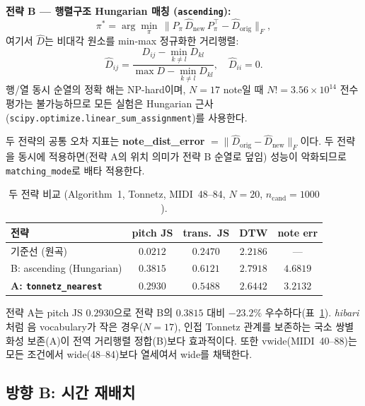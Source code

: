 \documentclass[conference,10pt,a4paper]{IEEEtran}
\begin{document}
\textbf{전략 B --- 행렬구조 Hungarian 매칭 (\texttt{ascending}):}
\begin{equation}
\pi^{*} = \arg\min_{\pi}\,
  \bigl\|P_{\pi}\,\hat{D}_{\mathrm{new}}\,P_{\pi}^{\top}
         - \hat{D}_{\mathrm{orig}}\bigr\|_{F},
\end{equation}
여기서 $\hat{D}$는 비대각 원소를 min-max 정규화한 거리행렬:
\begin{equation}
\hat{D}_{ij}
  = \frac{D_{ij}-\min_{k\neq l}D_{kl}}
         {\max D - \min_{k\neq l}D_{kl}},
\quad \hat{D}_{ii}=0.
\end{equation}
행/열 동시 순열의 정확 해는 NP-hard이며,
$N=17$ note일 때 $N!\!=3.56\times10^{14}$ 전수평가는 불가능하므로
모든 실험은 Hungarian 근사
(\texttt{scipy.optimize.linear\_sum\_assignment})를 사용한다.

두 전략의 공통 오차 지표는
\textbf{note\_dist\_error}
$=\|\hat{D}_{\mathrm{orig}}-\hat{D}_{\mathrm{new}}\|_F$이다.
두 전략을 동시에 적용하면(전략 A의 위치 의미가 전략 B 순열로 덮임)
성능이 악화되므로 \texttt{matching\_mode}로 배타 적용한다.

\begin{table}[t]
\centering
\caption{두 전략 비교 (Algorithm~1, Tonnetz, MIDI~48--84,
         $N=20$, $n_{\mathrm{cand}}=1000$).}
\label{tab:redistrib}
\begin{tabular}{lcccc}
\toprule
전략 & pitch JS & trans.\ JS & DTW & note err \\
\midrule
기준선 (원곡)
  & $0.0212$ & $0.2470$ & $2.2186$ & --- \\
B: ascending (Hungarian)
  & $0.3815$ & $0.6121$ & $2.7918$ & $4.6819$ \\
\textbf{A: \texttt{tonnetz\_nearest}}
  & $\mathbf{0.2930}$ & $\mathbf{0.5488}$ & $2.6442$ & $\mathbf{3.2132}$ \\
\bottomrule
\end{tabular}
\end{table}

전략 A는 pitch JS $0.2930$으로 전략 B의 $0.3815$ 대비
$-23.2\%$ 우수하다(표~\ref{tab:redistrib}).
\emph{hibari}처럼 음 vocabulary가 작은 경우($N=17$),
인접 Tonnetz 관계를 보존하는 국소 쌍별 화성 보존(A)이
전역 거리행렬 정합(B)보다 효과적이다.
또한 vwide(MIDI~40--88)는 모든 조건에서 wide(48--84)보다 열세여서
wide를 채택한다.

\subsection{방향 B: 시간 재배치}
\label{subsec:dirB}
\end{document}
